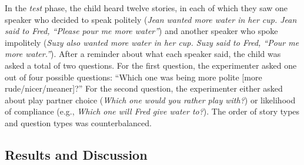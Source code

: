 \documentclass[10pt, letterpaper]{article}
\begin{document}
In the \emph{test} phase, the child heard twelve stories, in each of
which they saw one speaker who decided to speak politely (\emph{Jean
wanted more water in her cup. Jean said to Fred, ``Please pour me more
water''}) and another speaker who spoke impolitely (\emph{Suzy also
wanted more water in her cup. Suzy said to Fred, ``Pour me more
water.''}). After a reminder about what each speaker said, the child was
asked a total of two questions. For the first question, the experimenter
asked one out of four possible questions: ``Which one was being more
polite {[}more rude/nicer/meaner{]}?'' For the second question, the
experimenter either asked about play partner choice (\emph{Which one
would you rather play with?}) or likelihood of compliance (e.g.,
\emph{Which one will Fred give water to?}). The order of story types and
question types was counterbalanced.

\subsection{Results and Discussion}\label{results-and-discussion}
\end{document}
